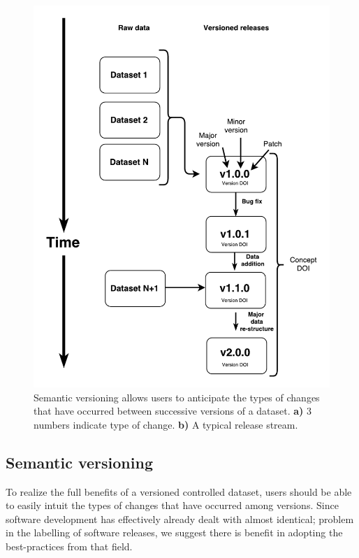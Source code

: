 \documentclass[a4paper,num-refs]{assets/oup-contemporary}
\begin{document}
\begin{figure}[!hb]
\centering
\includegraphics[width=\linewidth]{figures/Figure1.pdf}
\caption{
Semantic versioning allows users to anticipate the types of changes that have occurred between successive versions of a dataset.
\textbf{a)} 3 numbers indicate type of change.
\textbf{b)} A typical release stream.}
\label{fig:semantic}
\end{figure}

\subsection{Semantic versioning}

To realize the full benefits of a versioned controlled dataset, users should be able to easily intuit the types of changes that have occurred among versions. Since software development has effectively already dealt with almost identical; problem in the labelling of software releases, we suggest there is benefit in adopting the best-practices from that field.
\end{document}
